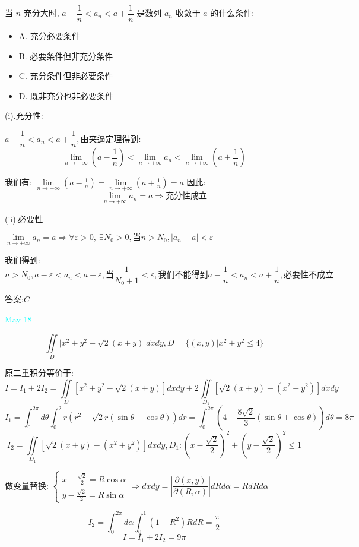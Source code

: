 \begin{example}[][Exam: 31.3.6]
	当 $n$ 充分大时, $a-\dfrac{1}{n} < a_{n} < a+\dfrac{1}{n}$ 是数列 $a_{n}$ 收敛于 $a$ 的什么条件:
\begin{itemize}
	\item A. 充分必要条件
	\item B. 必要条件但非充分条件
	\item C. 充分条件但非必要条件
	\item D. 既非充分也非必要条件
\end{itemize}
\end{example}

\begin{solution}
	
	(i).充分性: 
	
	$a-\dfrac{1}{n}<a_{n}<a+\dfrac{1}{n},\text{由夹逼定理得到: }$
	$$\lim\limits_{n\to +\infty}(a-\frac{1}{n})<\lim\limits_{n\to +\infty}a_{n}<\lim\limits_{n\to +\infty}(a+\frac{1}{n})$$
	
	我们有: $\lim\limits_{n\to +\infty}(a-\frac{1}{n})=\lim\limits_{n\to +\infty}(a+\frac{1}{n})=a$
	因此: 
	$$\lim\limits_{n\to +\infty}a_{n}=a\Rightarrow\text{充分性成立}$$
	
	(ii).必要性
	
	$\lim\limits_{n\to +\infty}a_{n}=a\Rightarrow \forall \varepsilon>0,\ \exists N_{0}>0,\text{当}n>N_{0},|a_{n}-a|<\varepsilon$
	
	我们得到: 
	$$n>N_{0},a-\varepsilon<a_{n}<a+\varepsilon,\text{当}\frac{1}{N_{0}+1}<\varepsilon,\text{我们不能得到}a-\frac{1}{n}<a_{n}<a+\frac{1}{n},\text{必要性不成立}$$
	
	答案:$C$
\end{solution}


\textcolor{cyan}{May 18}

\begin{example}[][Exam: 31.3.7]
	$$\iint\limits_{D}\big|x^2+y^2-\sqrt{2}(x+y)\big|dxdy, D=\{(x,y)|x^2+y^2\leq 4\}$$
\end{example}

\begin{solution}
	
	原二重积分等价于: 
	$$I=I_{1}+2I_{2}=\iint\limits_{D}[x^2+y^2-\sqrt{2}(x+y)]dxdy+2\iint\limits_{D_{1}}[\sqrt{2}(x+y)-(x^2+y^2)]dxdy$$
	$$I_{1}=\int_{0}^{2\pi}d\theta\int_{0}^{2}r(r^2-\sqrt{2}r(\sin \theta+\cos \theta))dr=\int_{0}^{2\pi}(4-\frac{8\sqrt{2}}{3}(\sin\theta+\cos\theta))d\theta=8\pi$$
	$$I_{2}=\iint\limits_{D_{1}}[\sqrt{2}(x+y)-(x^2+y^2)]dxdy,D_{1}: (x-\frac{\sqrt{2}}{2})^2+(y-\frac{\sqrt{2}}{2})^2\leq 1$$
	
	做变量替换: $\left\lbrace 
	\begin{array}{l}
		x-\frac{\sqrt{2}}{2}=R\cos \alpha\\
		y-\frac{\sqrt{2}}{2}=R\sin \alpha
	\end{array}
	\right. \Rightarrow dxdy=\left| \dfrac{\partial (x,y)}{\partial (R,\alpha)}\right| dRd\alpha=RdRd\alpha$
	
	$$I_{2}=\int_{0}^{2\pi}d\alpha\int_{0}^{1} (1-R^2)RdR=\frac{\pi}{2}$$
	$$I=I_{1}+2I_{2}=9\pi$$
\end{solution}

